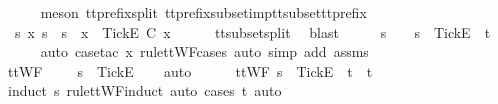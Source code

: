 \begin{isabellebody}
\ \ \ \ \isamarkupfalse%
\ {\isacharparenleft}meson\ tt{\isacharunderscore}prefix{\isacharunderscore}split\ tt{\isacharunderscore}prefix{\isacharunderscore}subset{\isacharunderscore}imp{\isacharunderscore}tt{\isacharunderscore}subset{\isacharunderscore}tt{\isacharunderscore}prefix{\isacharparenright}\isanewline
\ \ \isamarkupfalse%
\ \isamarkupfalse%
\ {\isachardoublequoteopen}{\isasymexists}\ s{\isacharprime}{\isacharprime}\ x{\isachardot}\ s{\isacharprime}\ {\isacharequal}\ s{\isacharprime}{\isacharprime}\ {\isacharat}\ x\ {\isasymand}\ {\isacharbrackleft}{\isacharbrackleft}Tick{\isacharbrackright}\isactrlsub E{\isacharbrackright}\ {\isasymsubseteq}\isactrlsub C\ x{\isachardoublequoteclose}\isanewline
\ \ \ \ \isamarkupfalse%
\ tt{\isacharunderscore}subset{\isacharunderscore}split{}\ \isamarkupfalse%
\ blast\isanewline
\ \ \isamarkupfalse%
\ \isamarkupfalse%
\ s{\isacharprime}{\isacharprime}\ \ {\isachardoublequoteopen}{\isasymsigma}\ {\isacharequal}\ s{\isacharprime}{\isacharprime}\ {\isacharat}\ {\isacharbrackleft}{\isacharbrackleft}Tick{\isacharbrackright}\isactrlsub E{\isacharbrackright}\ {\isacharat}\ t{\isachardoublequoteclose}\isanewline
\ \ \ \ \isamarkupfalse%
\ {\isacharparenleft}auto{\isacharcomma}\ case{\isacharunderscore}tac\ x\ rule{\isacharcolon}ttWF{\isachardot}cases{\isacharcomma}\ auto\ simp\ add{\isacharcolon}\ {\isasymsigma}{\isacharunderscore}assms{\isacharparenright}\isanewline
\ \ \isamarkupfalse%
\ \isamarkupfalse%
\ {\isachardoublequoteopen}ttWF\ {\isasymsigma}\ {\isasymLongrightarrow}\ {\isasymsigma}\ {\isacharequal}\ s{\isacharprime}{\isacharprime}\ {\isacharat}\ {\isacharbrackleft}{\isacharbrackleft}Tick{\isacharbrackright}\isactrlsub E{\isacharbrackright}{\isachardoublequoteclose}\isanewline
\ \ \isamarkupfalse%
\ auto\isanewline
\ \ \ \ \isamarkupfalse%
\ {\isachardoublequoteopen}ttWF\ {\isacharparenleft}s{\isacharprime}{\isacharprime}\ {\isacharat}\ {\isacharbrackleft}Tick{\isacharbrackright}\isactrlsub E\ {\isacharhash}\ t{\isacharparenright}\ {\isasymLongrightarrow}\ t\ {\isacharequal}\ {\isacharbrackleft}{\isacharbrackright}{\isachardoublequoteclose}\isanewline
\ \ \ \ \ \ \isamarkupfalse%
\ {\isacharparenleft}induct\ s{\isacharprime}{\isacharprime}\ rule{\isacharcolon}ttWF{\isachardot}induct{\isacharcomma}\ auto{\isacharcomma}\ cases\ t{\isacharcomma}\ auto{\isacharparenright}\isanewline

\end{isabellebody}
